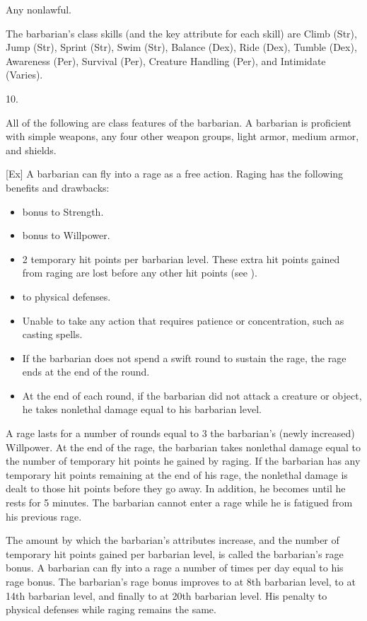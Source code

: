  Any nonlawful.

The barbarian's class skills (and the key attribute for each skill) are
Climb (Str), Jump (Str), Sprint (Str), Swim (Str), Balance (Dex), Ride (Dex), Tumble (Dex), Awareness (Per), Survival (Per), Creature Handling (Per), and Intimidate (Varies).

10.


All of the following are class features of the barbarian.
 A barbarian is proficient with simple weapons, any four other weapon groups, light armor, medium armor, and shields.

[Ex]
A barbarian can fly into a rage as a free action.
Raging has the following benefits and drawbacks:
\begin{itemize}
    \item {} bonus to Strength.
    \item {} bonus to Willpower.
    \item 2 temporary hit points per barbarian level.
        These extra hit points gained from raging are lost before any other hit points (see ).
    \item {} to physical defenses.
    \item Unable to take any action that requires patience or concentration, such as casting spells.
    \item If the barbarian does not spend a swift round to sustain the rage, the rage ends at the end of the round.
    \item At the end of each round, if the barbarian did not attack a creature or object, he takes nonlethal damage equal to his barbarian level.
\end{itemize}

A rage lasts for a number of rounds equal to 3 \add the barbarian's (newly increased) Willpower.
At the end of the rage, the barbarian takes nonlethal damage equal to the number of temporary hit points he gained by raging.
If the barbarian has any temporary hit points remaining at the end of his rage, the nonlethal damage is dealt to those hit points before they go away.
In addition, he becomes \fatigued until he rests for 5 minutes.
The barbarian cannot enter a rage while he is fatigued from his previous rage.

The amount by which the barbarian's attributes increase, and the number of temporary hit points gained per barbarian level, is called the barbarian's rage bonus.
A barbarian can fly into a rage a number of times per day equal to his rage bonus.
The barbarian's rage bonus improves to  at 8th barbarian level, to  at 14th barbarian level, and finally to  at 20th barbarian level.
His penalty to physical defenses while raging remains the same.

